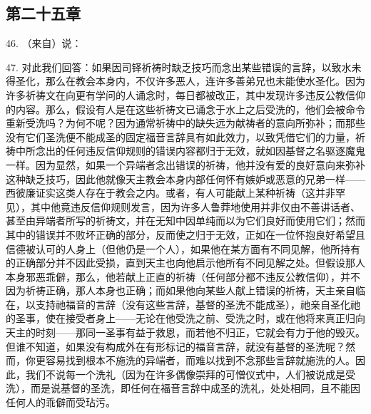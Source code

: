 
\subsection{第二十五章}

46. （来自）说：\par

47. 对此我们回答：如果因司铎祈祷时缺乏技巧而念出某些错误的言辞，以致水未得圣化，那么在教会本身内，不仅许多恶人，连许多善弟兄也未能使水圣化。因为许多祈祷文在向更有学问的人诵念时，每日都被改正，其中发现许多违反公教信仰的内容。那么，假设有人是在这些祈祷文已诵念于水上之后受洗的，他们会被命令重新受洗吗？为何不呢？因为通常祈祷中的缺失远为献祷者的意向所弥补；而那些没有它们圣洗便不能成圣的固定福音言辞具有如此效力，以致凭借它们的力量，祈祷中所念出的任何违反信仰规则的错误内容都归于无效，就如因基督之名驱逐魔鬼一样。因为显然，如果一个异端者念出错误的祈祷，他并没有爱的良好意向来弥补这种缺乏技巧，因此他就像天主教会本身内部任何怀有嫉妒或恶意的兄弟一样——西彼廉证实这类人存在于教会之内。或者，有人可能献上某种祈祷（这并非罕见），其中他竟违反信仰规则发言，因为许多人鲁莽地使用并非仅由不善讲话者、甚至由异端者所写的祈祷文，并在无知中因单纯而以为它们良好而使用它们；然而其中的错误并不败坏正确的部分，反而使之归于无效，正如在一位怀抱良好希望且信德被认可的人身上（但他仍是一个人），如果他在某方面有不同见解，他所持有的正确部分并不因此受损，直到天主也向他启示他所有不同见解之处。但假设那人本身邪恶乖僻，那么，他若献上正直的祈祷（任何部分都不违反公教信仰），并不因为祈祷正确，那人本身也正确；而如果他向某些人献上错误的祈祷，天主亲自临在，以支持祂福音的言辞（没有这些言辞，基督的圣洗不能成圣），祂亲自圣化祂的圣事，使在接受者身上——无论在他受洗之前、受洗之时，或在他将来真正归向天主的时刻——那同一圣事有益于救恩，而若他不归正，它就会有力于他的毁灭。但谁不知道，如果没有构成外在有形标记的福音言辞，就没有基督的圣洗呢？然而，你更容易找到根本不施洗的异端者，而难以找到不念那些言辞就施洗的人。因此，我们不说每一个洗礼（因为在许多偶像崇拜的可憎仪式中，人们被说成是受洗），而是说基督的圣洗，即任何在福音言辞中成圣的洗礼，处处相同，且不能因任何人的乖僻而受玷污。\par

